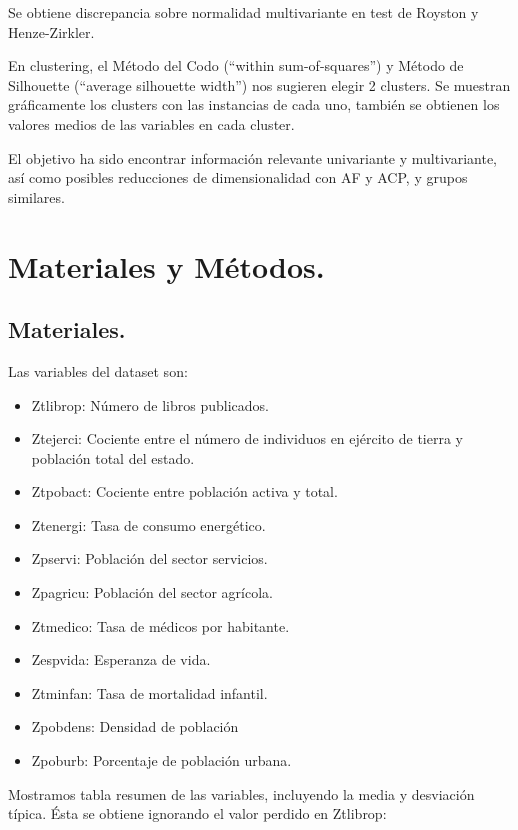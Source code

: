 \documentclass[11pt,a4paper]{article}
\begin{document}
    Se obtiene discrepancia sobre normalidad multivariante en test de Royston y Henze-Zirkler.
    
    En clustering, el Método del Codo (``within sum-of-squares'') y Método de Silhouette (``average silhouette width'') nos sugieren elegir 2 clusters. Se muestran gráficamente los clusters con las instancias de  cada uno, también se obtienen los valores medios de las variables en cada cluster.
    
    El objetivo ha sido encontrar información relevante univariante y multivariante, así como posibles reducciones de dimensionalidad con AF y ACP, y grupos similares.

	
	
    \section{Materiales y Métodos.}
    \subsection{Materiales.}
    Las variables del dataset son:
    \begin{itemize}
\item Ztlibrop: Número de libros publicados.
\item Ztejerci: Cociente entre el número de individuos en ejército de tierra y población total del
estado.
\item Ztpobact: Cociente entre población activa y total.
\item Ztenergi: Tasa de consumo energético.
\item Zpservi: Población del sector servicios.
\item Zpagricu: Población del sector agrícola.
\item Ztmedico: Tasa de médicos por habitante.
\item Zespvida: Esperanza de vida.
\item Ztminfan: Tasa de mortalidad infantil.
\item Zpobdens: Densidad de población
\item Zpoburb: Porcentaje de población urbana.
	\end{itemize}
	
	Mostramos tabla resumen de las variables, incluyendo la media y desviación típica. Ésta se obtiene ignorando el valor perdido en Ztlibrop:
	
\end{document}
